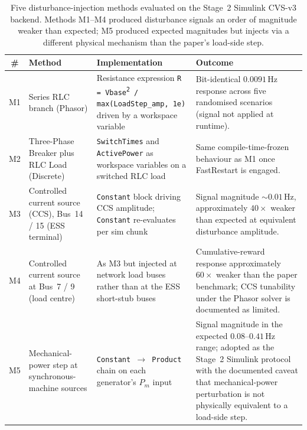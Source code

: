 \documentclass{unnc-fyp}
\begin{document}
\begin{table}[tb]
  \centering
  \small
  \caption{Five disturbance-injection methods evaluated on the
           Stage~2 Simulink CVS-v3 backend. Methods M1--M4 produced
           disturbance signals an order of magnitude weaker than
           expected; M5 produced expected magnitudes but injects
           via a different physical mechanism than the
           paper's load-side step.}
  \label{tab:simulink-injection}
  \begin{tabular}{@{}cp{3.2cm}p{4.4cm}p{4.0cm}@{}}
    \toprule
    \# & Method & Implementation & Outcome \\
    \midrule
    M1 & Series RLC branch (Phasor)
       & Resistance expression
         \texttt{R = Vbase\textsuperscript{2} / max(LoadStep\_amp, 1e\textminus3)}
         driven by a workspace variable
       & Bit-identical $0.0091$\,Hz response across five
         randomised scenarios (signal not applied at runtime). \\
    M2 & Three-Phase Breaker plus RLC Load (Discrete)
       & \texttt{SwitchTimes} and \texttt{ActivePower} as
         workspace variables on a switched RLC load
       & Same compile-time-frozen behaviour as M1 once
         FastRestart is engaged. \\
    M3 & Controlled current source (CCS), Bus~14 / 15 (ESS terminal)
       & \texttt{Constant} block driving CCS amplitude;
         \texttt{Constant} re-evaluates per sim chunk
       & Signal magnitude $\sim\!0.01$\,Hz, approximately
         $40\times$ weaker than expected at equivalent
         disturbance amplitude. \\
    M4 & Controlled current source at Bus~7 / 9 (load centre)
       & As M3 but injected at network load buses rather than
         at the ESS short-stub buses
       & Cumulative-reward response approximately $60\times$
         weaker than the paper benchmark; CCS tunability under
         the Phasor solver is documented as limited. \\
    M5 & Mechanical-power step at synchronous-machine sources
       & \texttt{Constant $\to$ Product} chain on each
         generator's $P_m$ input
       & Signal magnitude in the expected $0.08$--$0.41$\,Hz
         range; adopted as the Stage~2 Simulink protocol with
         the documented caveat that mechanical-power perturbation
         is not physically equivalent to a load-side step. \\
    \bottomrule
  \end{tabular}
\end{table}
\end{document}
